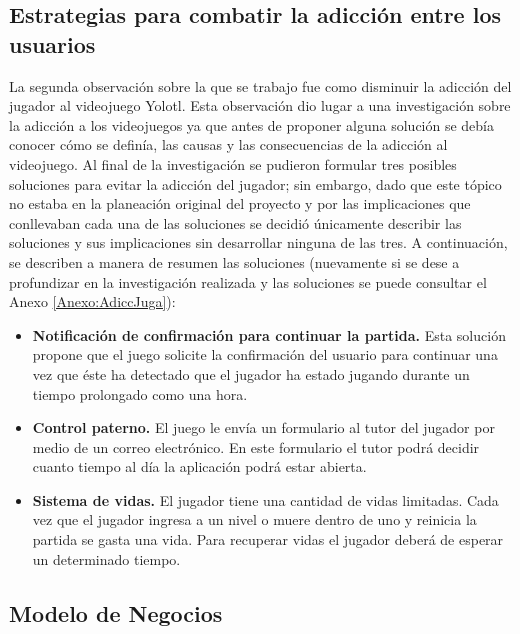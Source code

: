 \subsection{Estrategias para combatir la adicción entre los usuarios}
La segunda observación sobre la que se trabajo fue como disminuir la adicción 
del jugador al videojuego Yolotl. Esta observación dio lugar a una investigación 
sobre la adicción a los videojuegos ya que antes de proponer alguna solución se 
debía conocer cómo se definía, las causas y las consecuencias de la adicción al 
videojuego. Al final de la investigación se pudieron formular tres posibles 
soluciones para evitar la adicción del jugador; sin embargo, dado que este tópico 
no estaba en la planeación original del proyecto y por las implicaciones que 
conllevaban cada una de las soluciones se decidió únicamente describir las 
soluciones y sus implicaciones sin desarrollar ninguna de las tres. A continuación, 
se describen a manera de resumen las soluciones (nuevamente si se dese a 
profundizar en la investigación realizada y las soluciones se puede consultar 
el Anexo \ref{Anexo:AdiccJuga}):
	\begin{itemize}
		\item \textbf{Notificación de confirmación para continuar la partida.} Esta 
		solución propone que el juego solicite la confirmación del usuario para 
		continuar una vez que éste ha detectado que el jugador ha estado jugando 
		durante un tiempo prolongado como una hora.
		\item \textbf{Control paterno.} El juego le envía un formulario al tutor del 
		jugador por medio de un correo electrónico. En este formulario el tutor podrá 
		decidir cuanto tiempo al día la aplicación podrá estar abierta. 
		\item \textbf{Sistema de vidas.} El jugador tiene una cantidad de vidas 
		limitadas. Cada vez que el jugador ingresa a un nivel o muere dentro de 
		uno y reinicia la partida se gasta una vida. Para recuperar vidas el 
		jugador deberá de esperar un determinado tiempo.
	\end{itemize}
	
\subsection{Modelo de Negocios}
